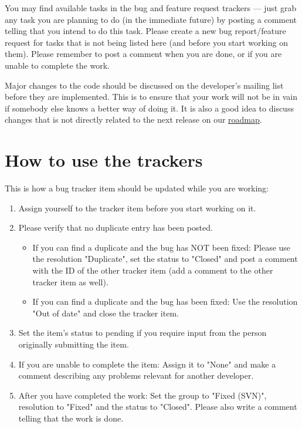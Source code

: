 \documentclass[12pt]{book}
\begin{document}
You may find available tasks in the bug and feature request
trackers --- just grab any task you are planning to do (in the
immediate future) by posting a comment telling that you intend
to do this task. Please create a new bug report/feature request
for tasks that is not being listed here (and before you start
working on them). Please remember to post a comment when
you are done, or if you are unable to complete the work.

Major changes to the code should be discussed on the
developer's mailing list before they are implemented. This is to
ensure that your work will not be in vain if somebody else knows
a better way of doing it. It is also a good idea to discuss changes
that is not directly related to the next release on our 
\href{http://www.freecol.org/index.php?section=18}{roadmap}.


\hypertarget{How to use the trackers}{\section{How to use the trackers}}

This is how a bug tracker item should be updated while you are working:

\begin{enumerate}
\item Assign yourself to the tracker item before you start working on it.

\item Please verify that no duplicate entry has been posted.

\begin{itemize}
\item If you can find a duplicate and the bug has NOT been fixed:
  Please use the resolution "Duplicate", set the status to "Closed"
  and post a comment with the ID of the other tracker item (add a
  comment to the other tracker item as well).

\item If you can find a duplicate and the bug has been fixed: Use the
  resolution "Out of date" and close the tracker item.
\end{itemize}

\item Set the item's status to pending if you require input from the person
   originally submitting the item.

\item If you are unable to complete the item: Assign it to "None" and
   make a comment describing any problems relevant for another developer.

\item After you have completed the work: Set the group to "Fixed (SVN)",
   resolution to "Fixed" and the status to "Closed". Please also write
   a comment telling that the work is done.
\end{enumerate}
\end{document}
